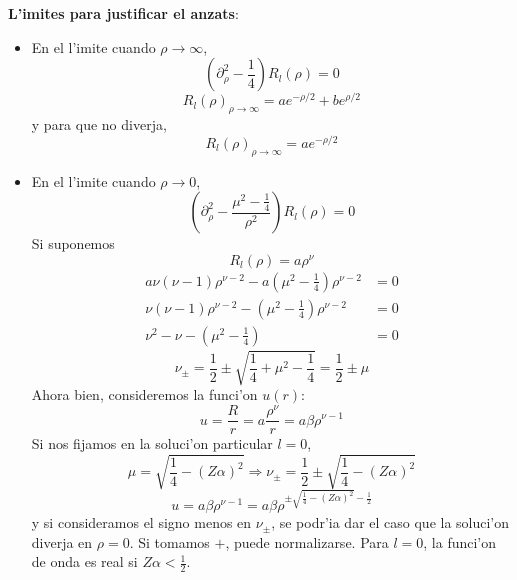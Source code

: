\textbf{L'imites para justificar el anzats}:

\begin{itemize}
\item En el l'imite cuando $\rho\rightarrow\infty$,
\begin{equation}
\left(  \partial_{\rho}^{2}-\frac{1}{4}\right)  R_{l}\left(  \rho\right)  =0
\end{equation}
\begin{equation}
R_{l}\left(  \rho\right)  _{\rho\rightarrow\infty}=ae^{-\rho/2}+be^{\rho/2}%
\end{equation}
y para que no diverja,
\begin{equation}
R_{l}\left(  \rho\right)  _{\rho\rightarrow\infty}=ae^{-\rho/2}%
\end{equation}


\item En el l'imite cuando $\rho\rightarrow0$,
\begin{equation}
\left(  \partial_{\rho}^{2}-\frac{\mu^{2}-\frac{1}{4}}{\rho^{2}}\right)
R_{l}\left(  \rho\right)  =0
\end{equation}
Si suponemos
\begin{equation}
R_{l}\left(  \rho\right)  =a\rho^{\nu}%
\end{equation}
\begin{align*}
a\nu\left(  \nu-1\right)  \rho^{\nu-2}-a\left(  \mu^{2}-\frac{1}{4}\right)
\rho^{\nu-2}  & =0\\
\nu\left(  \nu-1\right)  \rho^{\nu-2}-\left(  \mu^{2}-\frac{1}{4}\right)
\rho^{\nu-2}  & =0\\
\nu^{2}-\nu-\left(  \mu^{2}-\frac{1}{4}\right)   & =0
\end{align*}
\begin{equation}
\nu_{\pm}=\frac{1}{2}\pm\sqrt{\frac{1}{4}+\mu^{2}-\frac{1}{4}}=\frac{1}{2}%
\pm\mu
\end{equation}
Ahora bien, consideremos la funci'on $u\left(  r\right)  $:
\begin{equation}
u=\frac{R}{r}=a\frac{\rho^{\nu}}{r}=a\beta\rho^{\nu-1}%
\end{equation}
Si nos fijamos en la soluci'on particular $l=0$,
\begin{equation}
\mu=\sqrt{\frac{1}{4}-\left(  Z\alpha\right)  ^{2}}\Rightarrow\nu_{\pm}%
=\frac{1}{2}\pm\sqrt{\frac{1}{4}-\left(  Z\alpha\right)  ^{2}}%
\end{equation}
\begin{equation}
u=a\beta\rho^{\nu-1}=a\beta\rho^{\pm\sqrt{\frac{1}{4}-\left(  Z\alpha\right)
^{2}}-\frac{1}{2}}%
\end{equation}
y si consideramos el signo menos en $\nu_{\pm}$, se podr'ia dar el caso
que la soluci'on diverja en $\rho=0$. Si tomamos $+$, puede normalizarse.
Para $l=0$, la funci'on de onda es real si $Z\alpha<\frac{1}{2}$.
\end{itemize}


